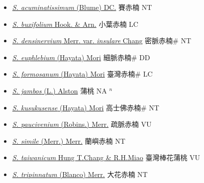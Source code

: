 \begin{itemize}
  \begin{itemize}
        \item[] \href{http://www.theplantlist.org/tpl1.1/search?q=Syzygium+acuminatissimum}{\textit{S. acuminatissimum} (Blume) DC.}     賽赤楠 NT
        \item[] \href{http://www.theplantlist.org/tpl1.1/search?q=Syzygium+buxifolium}{\textit{S. buxifolium} Hook. \& Arn.}   小葉赤楠 LC
        \item[] \href{http://www.theplantlist.org/tpl1.1/search?q=Syzygium+densinervium+var.+insulare}{\textit{S. densinervium} Merr. var. \textit{insulare} Chang}   密脈赤楠\# NT
        \item[] \href{http://www.theplantlist.org/tpl1.1/search?q=Syzygium+euphlebium}{\textit{S. euphlebium} (Hayata) Mori}   細脈赤楠\# DD
        \item[] \href{http://www.theplantlist.org/tpl1.1/search?q=Syzygium+formosanum}{\textit{S. formosanum} (Hayata) Mori}   臺灣赤楠\# LC
        \item[] \href{http://www.theplantlist.org/tpl1.1/search?q=Syzygium+jambos}{\textit{S. jambos} (L.) Alston}   蒲桃 NA $^n$
        \item[] \href{http://www.theplantlist.org/tpl1.1/search?q=Syzygium+kusukusense}{\textit{S. kusukusense} (Hayata) Mori}   高士佛赤楠\# NT
        \item[] \href{http://www.theplantlist.org/tpl1.1/search?q=Syzygium+paucivenium}{\textit{S. paucivenium} (Robins.) Merr.}   疏脈赤楠 VU
        \item[] \href{http://www.theplantlist.org/tpl1.1/search?q=Syzygium+simile}{\textit{S. simile} (Merr.) Merr.}   蘭嶼赤楠 NT
        \item[] \href{http://www.theplantlist.org/tpl1.1/search?q=Syzygium+taiwanicum}{\textit{S. taiwanicum} Hung T.Chang \& R.H.Miao}   臺灣棒花蒲桃 VU
        \item[] \href{http://www.theplantlist.org/tpl1.1/search?q=Syzygium+tripinnatum}{\textit{S. tripinnatum} (Blanco) Merr.}   大花赤楠 NT
  \end{itemize}
  \end{itemize}
